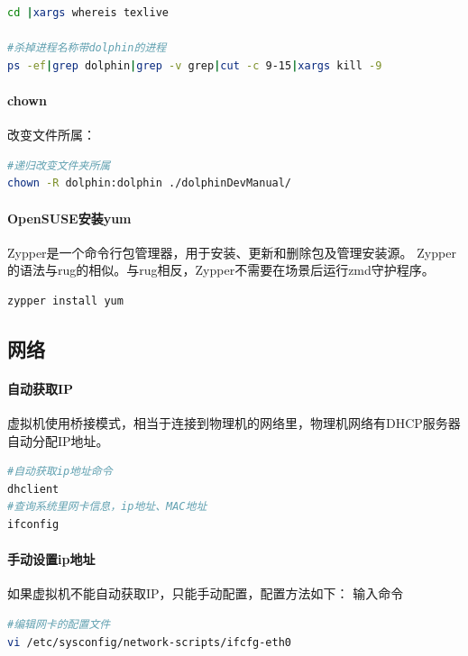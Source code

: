 \documentclass{book}
\begin{document}
\begin{lstlisting}[language=Bash]
cd |xargs whereis texlive

#杀掉进程名称带dolphin的进程
ps -ef|grep dolphin|grep -v grep|cut -c 9-15|xargs kill -9
\end{lstlisting}

\paragraph{chown}

改变文件所属：

\begin{lstlisting}[language=Bash]
#递归改变文件夹所属
chown -R dolphin:dolphin ./dolphinDevManual/
\end{lstlisting}

\paragraph{OpenSUSE安装yum}

Zypper是一个命令行包管理器，用于安装、更新和删除包及管理安装源。
Zypper的语法与rug的相似。与rug相反，Zypper不需要在场景后运行zmd守护程序。

\begin{lstlisting}[language=Bash]
zypper install yum
\end{lstlisting}

\subsection{网络}

\paragraph{自动获取IP}
虚拟机使用桥接模式，相当于连接到物理机的网络里，物理机网络有DHCP服务器自动分配IP地址。

\begin{lstlisting}[language=Bash]
#自动获取ip地址命令
dhclient 
#查询系统里网卡信息，ip地址、MAC地址
ifconfig 
\end{lstlisting}

\paragraph{手动设置ip地址}

如果虚拟机不能自动获取IP，只能手动配置，配置方法如下：
输入命令

\begin{lstlisting}[language=Bash]
#编辑网卡的配置文件
vi /etc/sysconfig/network-scripts/ifcfg-eth0
\end{lstlisting}
\end{document}
